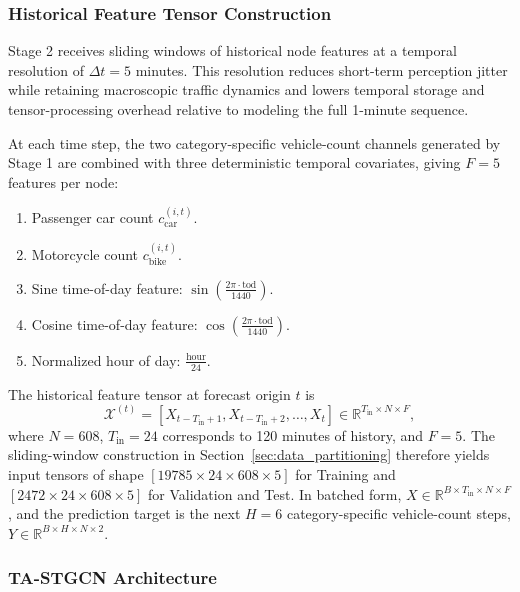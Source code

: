 \documentclass[preprint,12pt]{elsarticle}
\begin{document}
\subsubsection{Historical Feature Tensor Construction}
\label{sec:historical_features}

Stage 2 receives sliding windows of historical node features at a temporal resolution of $\Delta t=5$ minutes. This resolution reduces short-term perception jitter while retaining macroscopic traffic dynamics and lowers temporal storage and tensor-processing overhead relative to modeling the full 1-minute sequence.

At each time step, the two category-specific vehicle-count channels generated by Stage 1 are combined with three deterministic temporal covariates, giving $F=5$ features per node:
\begin{enumerate}
    \item Passenger car count $c_{\text{car}}^{(i,t)}$.
    \item Motorcycle count $c_{\text{bike}}^{(i,t)}$.
    \item Sine time-of-day feature: $\sin\left(\frac{2\pi \cdot \text{tod}}{1440}\right)$.
    \item Cosine time-of-day feature: $\cos\left(\frac{2\pi \cdot \text{tod}}{1440}\right)$.
    \item Normalized hour of day: $\frac{\text{hour}}{24}$.
\end{enumerate}

The historical feature tensor at forecast origin $t$ is
\begin{equation}
\mathcal{X}^{(t)}
=
\left[
X_{t-T_{\text{in}}+1},
X_{t-T_{\text{in}}+2},
\dots,
X_t
\right]
\in
\mathbb{R}^{T_{\text{in}} \times N \times F},
\end{equation}
where $N=608$, $T_{\text{in}}=24$ corresponds to 120 minutes of history, and $F=5$. The sliding-window construction in Section~\ref{sec:data_partitioning} therefore yields input tensors of shape $[19785 \times 24 \times 608 \times 5]$ for Training and $[2472 \times 24 \times 608 \times 5]$ for Validation and Test. In batched form, $X \in \mathbb{R}^{B \times T_{\text{in}} \times N \times F}$, and the prediction target is the next $H=6$ category-specific vehicle-count steps, $Y \in \mathbb{R}^{B \times H \times N \times 2}$.

\subsubsection{TA-STGCN Architecture}
\end{document}
